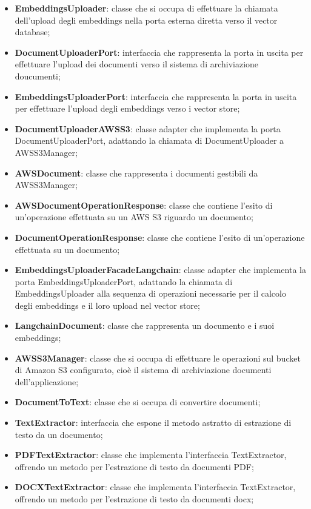 \documentclass[10pt, a4paper]{article}
\begin{document}
\begin{itemize}
    \item \textbf{EmbeddingsUploader}: classe che si occupa di effettuare la chiamata dell'upload degli embeddings nella porta esterna diretta verso il vector database;
    \item \textbf{DocumentUploaderPort}: interfaccia che rappresenta la porta in uscita per effettuare l'upload dei documenti verso il sistema di archiviazione doucumenti;
    \item \textbf{EmbeddingsUploaderPort}: interfaccia che rappresenta la porta in uscita per effettuare l'upload degli embeddings verso i vector store;
    \item \textbf{DocumentUploaderAWSS3}: classe adapter che implementa la porta DocumentUploaderPort, adattando la chiamata di DocumentUploader a AWSS3Manager;
    \item \textbf{AWSDocument}: classe che rappresenta i documenti gestibili da AWSS3Manager;
    \item \textbf{AWSDocumentOperationResponse}: classe che contiene l'esito di un'operazione effettuata su un AWS S3 riguardo un documento;
    \item \textbf{DocumentOperationResponse}: classe che contiene l'esito di un'operazione effettuata su un documento;
    \item \textbf{EmbeddingsUploaderFacadeLangchain}: classe adapter che implementa la porta EmbeddingsUploaderPort, adattando la chiamata di EmbeddingsUploader alla sequenza di operazioni necessarie per il calcolo degli embeddings e il loro upload nel vector store;
    \item \textbf{LangchainDocument}: classe che rappresenta un documento e i suoi embeddings;
    \item \textbf{AWSS3Manager}: classe che si occupa di effettuare le operazioni sul bucket di Amazon S3 configurato, cioè il sistema di archiviazione documenti dell'applicazione;
    \item \textbf{DocumentToText}: classe che si occupa di convertire documenti;
    \item \textbf{TextExtractor}: interfaccia che espone il metodo astratto di estrazione di testo da un documento;
    \item \textbf{PDFTextExtractor}: classe che implementa l'interfaccia TextExtractor, offrendo un metodo per l'estrazione di testo da documenti PDF;
    \item \textbf{DOCXTextExtractor}: classe che implementa l'interfaccia TextExtractor, offrendo un metodo per l'estrazione di testo da documenti docx;

\end{itemize}
\end{document}
